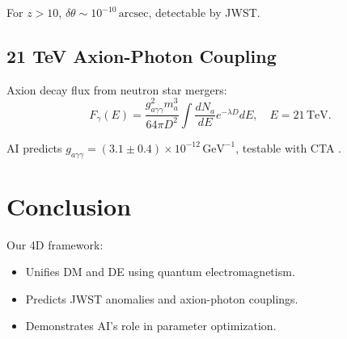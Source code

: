 \documentclass[12pt, a4paper]{article}
\begin{document}
For \( z > 10 \), \( \delta\theta \sim 10^{-10} \, \text{arcsec} \), detectable by JWST.  

\subsection{21 TeV Axion-Photon Coupling}  
\label{subsec:axion}  

Axion decay flux from neutron star mergers:  
\begin{equation}  
F_\gamma(E) = \frac{g_{a\gamma\gamma}^2 m_a^3}{64\pi D^2} \int \frac{dN_a}{dE} e^{-\lambda D} dE, \quad E = 21 \, \text{TeV}.  
\label{eq:axion_flux}  
\end{equation}  

AI predicts \( g_{a\gamma\gamma} = (3.1 \pm 0.4) \times 10^{-12} \, \text{GeV}^{-1} \), testable with CTA \citep{CTA2023}.  

\section{Conclusion}  
\label{sec:conclusion}  

Our 4D framework:  
\begin{itemize}  
\item Unifies DM and DE using quantum electromagnetism.  
\item Predicts JWST anomalies and axion-photon couplings.  
\item Demonstrates AI’s role in parameter optimization.  
\end{itemize}  

  
  
\end{document}
